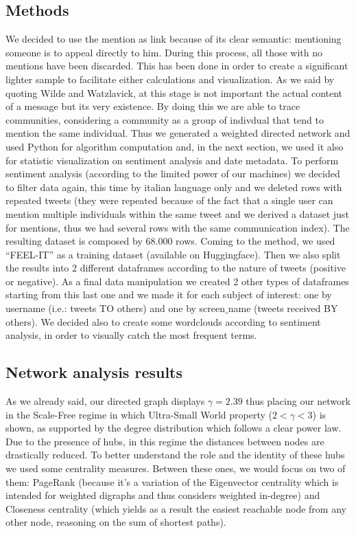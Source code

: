 \documentclass[sigchi]{acmart}
\begin{document}
\subsection{Methods}
We decided to use the mention as link because of its clear semantic: mentioning someone is to appeal directly to him. During this process, all those with no mentions have been discarded. This has been done in order to create a significant lighter sample to facilitate either calculations and visualization.
As we said by quoting Wilde and Watzlavick, at this stage is not important the actual content of a message but its very existence. By doing this we are able to trace communities, considering a community as a group of indivdual that tend to mention the same individual. Thus we generated a weighted directed network and used Python for algorithm computation and, in the next section, we used it also for statistic visualization on sentiment analysis and date metadata.
To perform sentiment analysis (according to the limited power of our machines) we decided to filter data again, this time by italian language only and we deleted rows with repeated tweets (they were repeated because of the fact that a single user can mention multiple individuals within the same tweet and we derived a dataset just for mentions, thus we had several rows with the same communication index). The resulting dataset is composed by 68.000 rows. Coming to the method, we used “FEEL-IT” as a training dataset (available on Huggingface). Then we also split the results into 2 different dataframes according to the nature of tweets (positive or negative). As a final data manipulation we created 2 other types of dataframes starting from this last one and we made it for each subject of interest: one by username (i.e.: tweets TO others) and one by screen$\_$name (tweets received BY others). We decided also to create some wordclouds according to sentiment analysis, in order to visually catch the most frequent terms.

\subsection{ Network analysis results}
As we already said, our directed graph displays $\gamma = 2.39$ thus placing our network in the Scale-Free regime in which Ultra-Small World\cite{barabasiCh4.6} property ($2< \gamma <3$) is shown, as supported by the degree distribution which follows a clear power law. Due to the presence of hubs, in this regime the distances between nodes are drastically reduced. To better understand the role and the identity of these hubs we used some centrality measures. Between these ones, we would focus on two of them: PageRank (because it’s a variation of the Eigenvector centrality which is intended for weighted digraphs and thus considers weighted in-degree) and Closeness centrality (which yields as a result the easiest reachable node from any other node, reasoning on the sum of shortest paths).
\end{document}
